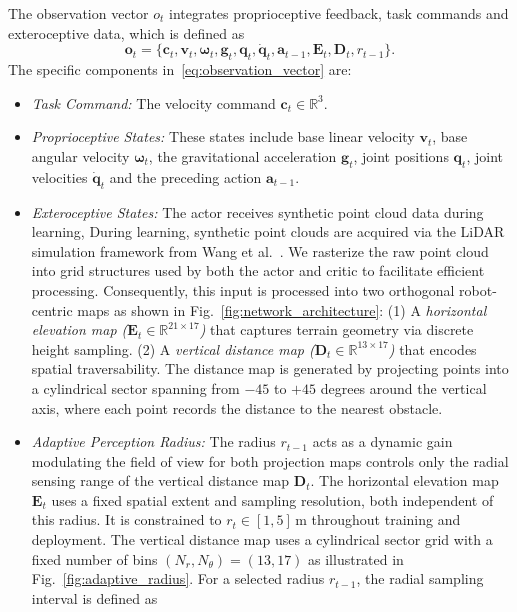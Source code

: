 \documentclass[letterpaper, 10 pt, conference]{ieeeconf/ieeeconf}
\providecommand{\DIFadd}[1]{{\protect\color{blue} \sf #1}} %
\providecommand{\DIFdel}[1]{{\protect\color{red} \scriptsize #1}} %
\providecommand{\DIFaddbegin}{} %
\providecommand{\DIFaddend}{} %
\providecommand{\DIFdelbegin}{} %
\providecommand{\DIFdelend}{} %
\begin{document}
The observation vector $o_t$ integrates proprioceptive feedback, task commands and exteroceptive data, which is defined as
\begin{equation}
\mathbf{o}_t = \{
\mathbf{c}_t, 
\mathbf{v}_t, \boldsymbol{\omega}_t, \mathbf{g}_t, \mathbf{q}_t, \dot{\mathbf{q}}_t, \mathbf{a}_{t-1},
\mathbf{E}_t, \mathbf{D}_t, r_{t-1}
\}.
\label{eq:observation_vector}
\end{equation}
The specific components in~\eqref{eq:observation_vector} are:
\begin{itemize}
    \item \textit{Task Command:} The velocity command $\mathbf{c}_t \in \mathbb{R}^3$.
    \item \textit{Proprioceptive States:} These states include base linear velocity $\mathbf{v}_t$, base angular velocity $\boldsymbol{\omega}_t$, the gravitational acceleration $\mathbf{g}_t$, joint positions $\mathbf{q}_t$, joint velocities $\dot{\mathbf{q}}_t$ and the preceding action $\mathbf{a}_{t-1}$.
    \item \textit{Exteroceptive States:} \DIFdelbegin \DIFdel{The actor receives synthetic point cloud data during learning, }\DIFdelend \DIFaddbegin \DIFadd{During learning, synthetic point clouds are }\DIFaddend acquired via the LiDAR simulation framework from Wang et al.~\cite{Wang_2025_Omni-Perception}.
    We rasterize the raw point cloud into grid structures \DIFaddbegin \DIFadd{used by both the actor and critic }\DIFaddend to facilitate efficient processing. Consequently, this input is processed into two orthogonal robot-centric maps as shown in Fig.~\ref{fig:network_architecture}:
    (1) A \textit{horizontal elevation map ($\mathbf{E}_t \in \mathbb{R}^{21 \times 17}$)} that captures terrain geometry via discrete height sampling.
    (2) A \textit{vertical distance map ($\mathbf{D}_t \in \mathbb{R}^{13 \times 17}$)} that encodes spatial traversability. The distance map is generated by projecting points into a cylindrical sector spanning from $-45$ to $+45$ degrees around the vertical axis, where each point records the distance to the nearest obstacle.
    \item \textit{Adaptive Perception Radius:} The radius $r_{t-1}$ \DIFdelbegin \DIFdel{acts as a dynamic gain modulating the field of view for both projection maps}\DIFdelend \DIFaddbegin \DIFadd{controls only the radial sensing range of the vertical distance map $\mathbf{D}_t$. The horizontal elevation map $\mathbf{E}_t$ uses a fixed spatial extent and sampling resolution, both independent of this radius}\DIFaddend . It is constrained to $r_t \in [1, 5]$\,m throughout training and deployment. The vertical distance map uses a cylindrical sector grid with a fixed number of bins $(N_r, N_\theta) = (13, 17)$ as illustrated in Fig.~\ref{fig:adaptive_radius}. For a selected radius $r_{t-1}$, the radial sampling interval is defined as

\end{itemize}
\end{document}
